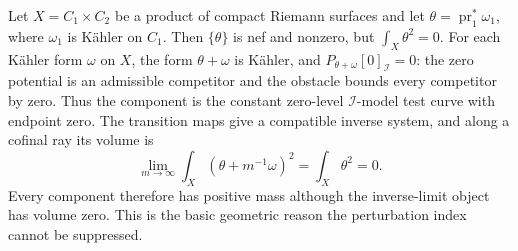 \begin{example}
\label{ex:tna-product-zero-volume}
Let $X=C_1\times C_2$ be a product of compact Riemann surfaces and let
$\theta=\operatorname{pr}_1^*\omega_1$, where $\omega_1$ is K\"ahler
on $C_1$.  Then $\{\theta\}$ is nef and nonzero, but
$\int_X\theta^2=0$.  For each K\"ahler form $\omega$ on $X$, the
form $\theta+\omega$ is K\"ahler, and
$P_{\theta+\omega}[0]_{\mathcal I}=0$: the zero potential is an
admissible competitor and the obstacle bounds every competitor by zero.
Thus the component is the constant zero-level $\mathcal I$-model test
curve with endpoint zero.  The transition maps
give a compatible inverse system, and along a cofinal ray its volume is
\[
             \lim_{m\to\infty}\int_X
             (\theta+m^{-1}\omega)^2=\int_X\theta^2=0.
\]
Every component therefore has positive mass although the inverse-limit
object has volume zero.  This is the basic geometric reason the
perturbation index cannot be suppressed.
\end{example}

